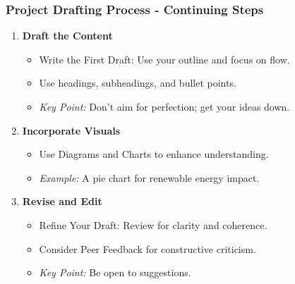 \documentclass[aspectratio=169]{beamer}
\begin{document}
\begin{frame}[fragile]
    \frametitle{Project Drafting Process - Continuing Steps}
    \begin{enumerate}[resume]
        \item \textbf{Draft the Content}
            \begin{itemize}
                \item Write the First Draft: Use your outline and focus on flow.
                \item Use headings, subheadings, and bullet points.
                \item \textit{Key Point:} Don’t aim for perfection; get your ideas down.
            \end{itemize}
        
        \item \textbf{Incorporate Visuals}
            \begin{itemize}
                \item Use Diagrams and Charts to enhance understanding.
                \item \textit{Example:} A pie chart for renewable energy impact.
            \end{itemize}
        
        \item \textbf{Revise and Edit}
            \begin{itemize}
                \item Refine Your Draft: Review for clarity and coherence.
                \item Consider Peer Feedback for constructive criticism.
                \item \textit{Key Point:} Be open to suggestions.
            \end{itemize}
    \end{enumerate}
\end{frame}
\end{document}
